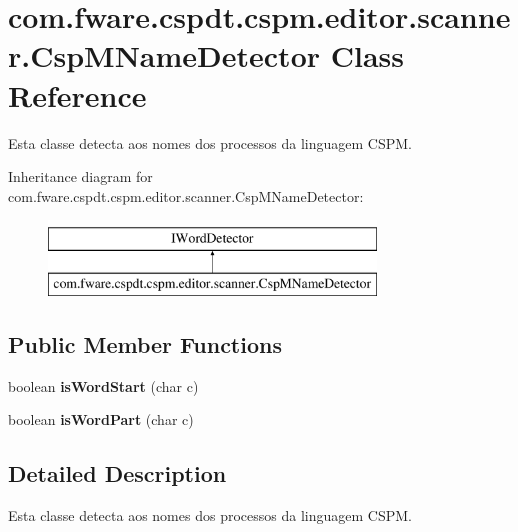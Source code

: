 \hypertarget{classcom_1_1fware_1_1cspdt_1_1cspm_1_1editor_1_1scanner_1_1_csp_m_name_detector}{}\section{com.\+fware.\+cspdt.\+cspm.\+editor.\+scanner.\+Csp\+M\+Name\+Detector Class Reference}
\label{classcom_1_1fware_1_1cspdt_1_1cspm_1_1editor_1_1scanner_1_1_csp_m_name_detector}


Esta classe detecta aos nomes dos processos da linguagem C\+S\+PM.  


Inheritance diagram for com.\+fware.\+cspdt.\+cspm.\+editor.\+scanner.\+Csp\+M\+Name\+Detector\+:\begin{figure}[H]
\begin{center}
\leavevmode
\includegraphics[height=2.000000cm]{classcom_1_1fware_1_1cspdt_1_1cspm_1_1editor_1_1scanner_1_1_csp_m_name_detector}
\end{center}
\end{figure}
\subsection*{Public Member Functions}
\begin{DoxyCompactItemize}
\item 
\mbox{\label{classcom_1_1fware_1_1cspdt_1_1cspm_1_1editor_1_1scanner_1_1_csp_m_name_detector_aea61d9e2c34d770ce08ab63a8eab7152}} 
boolean {\bfseries is\+Word\+Start} (char c)
\item 
\mbox{\label{classcom_1_1fware_1_1cspdt_1_1cspm_1_1editor_1_1scanner_1_1_csp_m_name_detector_a4a7df1b25e574d1bb73f8df1dadb4b7d}} 
boolean {\bfseries is\+Word\+Part} (char c)
\end{DoxyCompactItemize}


\subsection{Detailed Description}
Esta classe detecta aos nomes dos processos da linguagem C\+S\+PM. 

